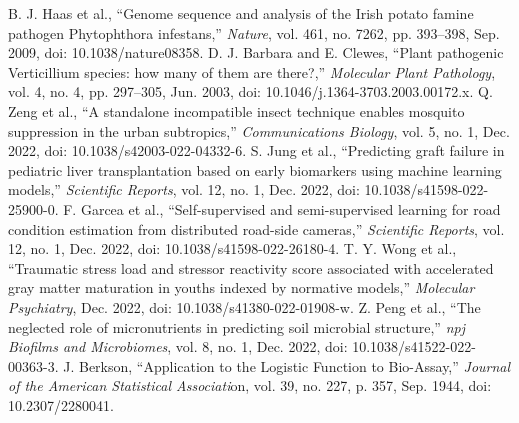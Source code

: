 \documentclass[conference]{IEEEtran}
\begin{document}
\begin{thebibliography}{00}
 B. J. Haas et al., “Genome sequence and analysis of the Irish potato famine pathogen Phytophthora infestans,” \textit{Nature}, vol. 461, no. 7262, pp. 393–398, Sep. 2009, doi: 10.1038/nature08358.
 D. J. Barbara and E. Clewes, “Plant pathogenic Verticillium species: how many of them are there?,” \textit{Molecular Plant Pathology}, vol. 4, no. 4, pp. 297–305, Jun. 2003, doi: 10.1046/j.1364-3703.2003.00172.x.
 Q. Zeng et al., “A standalone incompatible insect technique enables mosquito suppression in the urban subtropics,” \textit{Communications Biology}, vol. 5, no. 1, Dec. 2022, doi: 10.1038/s42003-022-04332-6.
 S. Jung et al., “Predicting graft failure in pediatric liver transplantation based on early biomarkers using machine learning models,” \textit{Scientific Reports}, vol. 12, no. 1, Dec. 2022, doi: 10.1038/s41598-022-25900-0.
 F. Garcea et al., “Self-supervised and semi-supervised learning for road condition estimation from distributed road-side cameras,” \textit{Scientific Reports}, vol. 12, no. 1, Dec. 2022, doi: 10.1038/s41598-022-26180-4.
 T. Y. Wong et al., “Traumatic stress load and stressor reactivity score associated with accelerated gray matter maturation in youths indexed by normative models,” \textit{Molecular Psychiatry}, Dec. 2022, doi: 10.1038/s41380-022-01908-w.
 Z. Peng et al., “The neglected role of micronutrients in predicting soil microbial structure,” \textit{npj Biofilms and Microbiomes}, vol. 8, no. 1, Dec. 2022, doi: 10.1038/s41522-022-00363-3.
 J. Berkson, “Application to the Logistic Function to Bio-Assay,” \textit{Journal of the American Statistical Associati}on, vol. 39, no. 227, p. 357, Sep. 1944, doi: 10.2307/2280041.
\end{thebibliography}
\end{document}
